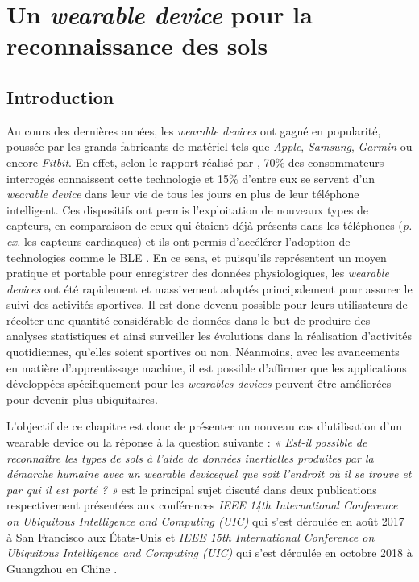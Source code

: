 \chapter{Un \textit{wearable device} pour la reconnaissance des sols}
\label{chap:4}

\section{Introduction}

Au cours des dernières années, les \textit{wearable devices} ont gagné en popularité, poussée par les grands fabricants de matériel tels que \textit{Apple}, \textit{Samsung}, \textit{Garmin} ou encore \textit{Fitbit}. En effet, selon le rapport réalisé par \cite{Nielsen2014}, 70\% des consommateurs interrogés connaissent cette technologie et 15\% d'entre eux se servent d'un \textit{wearable device} dans leur vie de tous les jours en plus de leur téléphone intelligent. Ces dispositifs ont permis l'exploitation de nouveaux types de capteurs, en comparaison de ceux qui étaient déjà présents dans les téléphones (\textit{p. ex.} les capteurs cardiaques) et ils ont permis d'accélérer l'adoption de technologies comme le \acs{BLE} \citep{Taplett}. En ce sens, et puisqu'ils représentent un moyen pratique et portable pour enregistrer des données physiologiques,  les \textit{wearable devices} ont été rapidement et massivement adoptés principalement pour assurer le suivi des activités sportives. Il est donc devenu possible pour leurs utilisateurs de récolter une quantité considérable de données dans le but de produire des analyses statistiques et ainsi surveiller les évolutions dans la réalisation d'activités quotidiennes, qu'elles soient sportives ou non. Néanmoins, avec les avancements en matière d'apprentissage machine, il est possible d'affirmer que les applications développées spécifiquement pour les \textit{wearables devices} peuvent être améliorées pour devenir plus ubiquitaires.

L'objectif de ce chapitre est donc de présenter un nouveau cas d'utilisation d'un wearable device ou la réponse à la question suivante : \textit{« Est-il possible de reconnaître les types de sols à l'aide de données inertielles produites par la démarche humaine avec un wearable device\textemdash quel que soit l'endroit où il se trouve et par qui il est porté ? »} est le principal sujet discuté dans deux publications respectivement présentées aux conférences \textit{IEEE 14th International Conference on Ubiquitous Intelligence and Computing (UIC)} qui s'est déroulée en août 2017 à San Francisco aux États-Unis \citep{Thullier2017a} et \textit{IEEE 15th International Conference on Ubiquitous Intelligence and Computing (UIC)} qui s'est déroulée en octobre 2018 à Guangzhou en Chine \citep{Thullier2018}.

